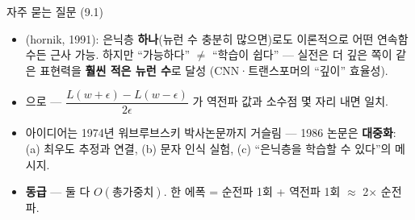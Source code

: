 \begin{frame}{자주 묻는 질문 (9.1)}
  \small
  \begin{itemize}
    \item {}
      (hornik, 1991): 은닉층 \textbf{하나}(뉴런 수 충분히
      많으면)로도 이론적으로 어떤 연속함수든 근사 가능. 하지만
      ``가능하다'' $\neq$ ``학습이 쉽다'' — 실전은 더 깊은 쪽이
      같은 표현력을 \textbf{훨씬 적은 뉴런 수}로 달성 (CNN·트랜스포머의
      ``깊이'' 효율성).
    \item {}
      으로 — $\dfrac{L(w+\epsilon)-L(w-\epsilon)}{2\epsilon}$
      가 역전파 값과 소수점 몇 자리 내면 일치.
    \item {}
      아이디어는 1974년 워브루브스키 박사논문까지 거슬림 — 1986 논문은
      \textbf{대중화}: (a) 최우도 추정과 연결, (b) 문자 인식 실험,
      (c) ``은닉층을 학습할 수 있다''의 메시지.
    \item {}
      \textbf{동급} — 둘 다 $O(\text{총가중치})$.
      한 에폭 = 순전파 1회 + 역전파 1회 $\approx$ 2$\times$ 순전파.
  \end{itemize}
\end{frame}
